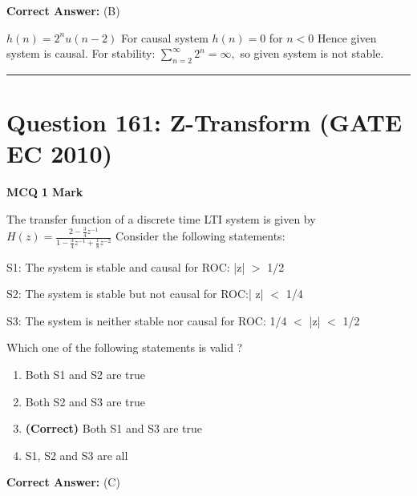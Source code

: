 \documentclass[11pt,a4paper]{article}
\begin{document}
\noindent \textbf{Correct Answer:} (B)

\begin{tcolorbox}[solbox, title=Detailed Solution -- Question 160]
$h(n)=2^{n} u(n-2)$
 For causal system $h(n)=0$ for $n < 0$
 Hence given system is causal.
 For stability:
$\sum_{n=2}^{\infty} 2^{n}=\infty,$ so given system is not stable.
\end{tcolorbox}

\vspace{1.5em}
\hrule
\vspace{1.5em}

\section*{Question 161: Z-Transform (GATE EC 2010)}
\noindent \textbf{\color{primary}MCQ} \hfill \textbf{\color{secondary}1 Mark}


\noindent The transfer function of a discrete time LTI system is given by 
 $H(z)=\frac{2-\frac{3}{4}z^{-1}}{1-\frac{3}{4}z^{-1}+\frac{1}{8}z^{-2}}$ 
 Consider the following statements: 

S1: The system is stable and causal for ROC: |z| $>$
1/2 

S2: The system is stable but not causal for ROC:| z| $<$
1/4 

S3: The system is neither stable nor causal for ROC: 1/4 $<$
|z| $<$
1/2 

Which one of the following statements is valid ?


\begin{enumerate}[label=(\Alph*)]
    \item Both S1 and S2 are true
    \item Both S2 and S3 are true
    \item \textbf{(Correct)} Both S1 and S3 are true
    \item S1, S2 and S3 are all
\end{enumerate}

\noindent \textbf{Correct Answer:} (C)
\end{document}
